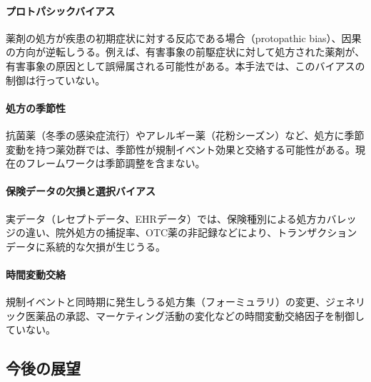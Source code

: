 \documentclass[11pt]{article}
\begin{document}
\paragraph{プロトパシックバイアス}
薬剤の処方が疾患の初期症状に対する反応である場合（protopathic bias）、因果の方向が逆転しうる。例えば、有害事象の前駆症状に対して処方された薬剤が、有害事象の原因として誤帰属される可能性がある。本手法では、このバイアスの制御は行っていない。

\paragraph{処方の季節性}
抗菌薬（冬季の感染症流行）やアレルギー薬（花粉シーズン）など、処方に季節変動を持つ薬効群では、季節性が規制イベント効果と交絡する可能性がある。現在のフレームワークは季節調整を含まない。

\paragraph{保険データの欠損と選択バイアス}
実データ（レセプトデータ、EHRデータ）では、保険種別による処方カバレッジの違い、院外処方の捕捉率、OTC薬の非記録などにより、トランザクションデータに系統的な欠損が生じうる。

\paragraph{時間変動交絡}
規制イベントと同時期に発生しうる処方集（フォーミュラリ）の変更、ジェネリック医薬品の承認、マーケティング活動の変化などの時間変動交絡因子を制御していない。

\subsection{今後の展望}
\end{document}

